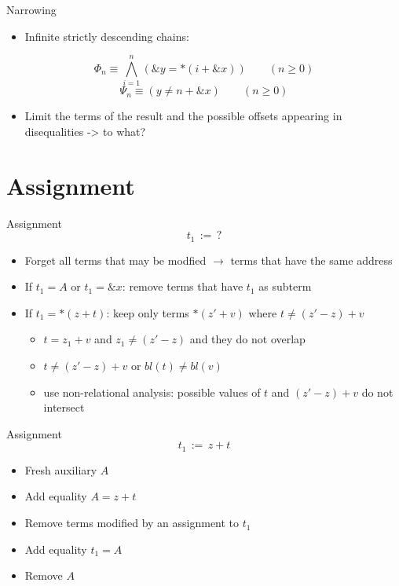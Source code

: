 \documentclass{beamer}
\begin{document}
\begin{frame}{Narrowing}
    \begin{itemize}
        \item Infinite strictly descending chains:
    \end{itemize}
    \[
        \Phi_n \equiv\bigwedge_{i=1}^n (\&y = *(i+\&x))\qquad(n\geq 0)
    \]
    \[
        \Psi_n \equiv (y\neq n+\&x)\qquad(n\geq 0)
    \]
    \begin{itemize}
        \item Limit the terms of the result and the possible offsets
              appearing in disequalities -> to what?
    \end{itemize}

\end{frame}

\section{Assignment}

\begin{frame}{Assignment}
    \[
        t_1\,{:=}\,?
    \]
    \begin{itemize}
        \item Forget all terms that may be modfied $\rightarrow$ terms that have the same address
        \item If $t_1 = A$ or $t_1 = \&x$: remove terms that have $t_1$ as subterm
        \item If $t_1 = *(z + t)$: keep only terms $*(z' + v)$ where $t \neq (z' - z) + v$
              \begin{itemize}
                  \item $t = z_1 + v$ and $z_1 \neq (z' - z)$ and they do not overlap
                  \item $t \neq (z' - z) + v$ or $bl(t) \neq bl(v)$
                  \item use non-relational analysis: possible values of $t$ and $(z' - z) + v$ do not intersect
              \end{itemize}
    \end{itemize}
\end{frame}

\begin{frame}{Assignment}
    \[
        t_1\,{:=}\,z + t
    \]
    \begin{itemize}
        \item Fresh auxiliary $A$
        \item Add equality $A = z + t$
        \item Remove terms modified by an assignment to $t_1$
        \item Add equality $t_1 = A$
        \item Remove $A$
    \end{itemize}
\end{frame}
\end{document}
